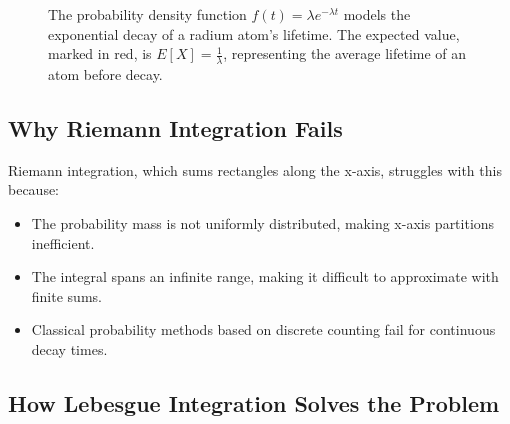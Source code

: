 \begin{figure}[h]
    \centering

    \caption{The probability density function \( f(t) = \lambda e^{-\lambda t} \) models the exponential decay of a radium atom's lifetime. The expected value, marked in red, is \( E[X] = \frac{1}{\lambda} \), representing the average lifetime of an atom before decay.}
\end{figure}


\subsection{Why Riemann Integration Fails}

Riemann integration, which sums rectangles along the x-axis, struggles with this because:

\begin{itemize}
    \item The probability mass is not uniformly distributed, making x-axis partitions inefficient.
    \item The integral spans an infinite range, making it difficult to approximate with finite sums.
    \item Classical probability methods based on discrete counting fail for continuous decay times.
\end{itemize}

\subsection{How Lebesgue Integration Solves the Problem}

